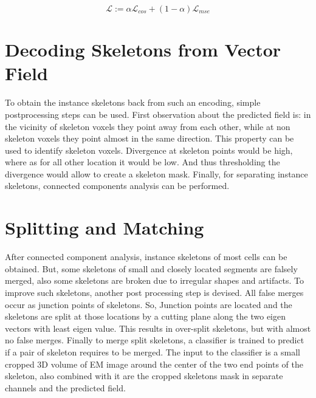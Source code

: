 \begin{equation} \label{loss}
\mathcal{L} := \alpha\mathcal{L}_{cos} + (1-\alpha)\mathcal{L}_{mse}
\end{equation}

\section{Decoding Skeletons from Vector Field}
To obtain the instance skeletons back from such an encoding, simple postprocessing steps can be used. First observation about the predicted field is: in the vicinity of skeleton voxels they point away from each other, while at non skeleton voxels they point almost in the same direction. This property can be used to identify skeleton voxels. Divergence at skeleton points would be high, where as for all other location it would be low. And thus thresholding the divergence would allow to create a skeleton mask. Finally, for separating instance skeletons, connected components analysis can be performed.

\section{Splitting and Matching}
After connected component analysis, instance skeletons of most cells can be obtained. But, some skeletons of small and closely located segments are falsely merged, also some skeletons are broken due to irregular shapes and artifacts. To improve such skeletons, another post processing step is devised. 
All false merges occur as junction points of skeletons. So, Junction points are located and the skeletons are split at those locations by a cutting plane along the two eigen vectors with least eigen value.
This results in over-split skeletons, but with almost no false merges.
Finally to merge split skeletons, a classifier is trained to predict if a pair of skeleton requires to be merged. The input to the classifier is a small cropped 3D volume of EM image around the center of the two end points of the skeleton, also combined with it are the cropped skeletons mask in separate channels and the predicted field.

